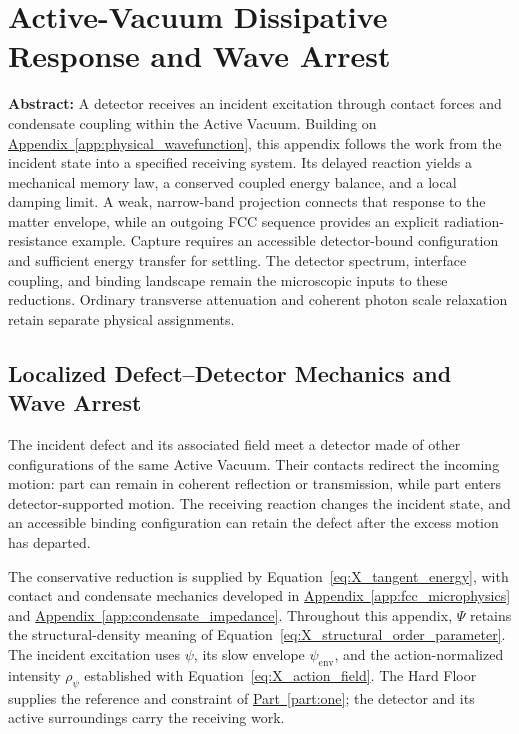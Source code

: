 \chapter{Active-Vacuum Dissipative Response and Wave Arrest}
\label{app:matter_vnlw_photon_linear_waveequation}

\noindent\textbf{Abstract:}
A detector receives an incident excitation through contact forces and condensate coupling within the Active Vacuum. Building on \hyperref[app:physical_wavefunction]{Appendix~\ref*{app:physical_wavefunction}}, this appendix follows the work from the incident state into a specified receiving system. Its delayed reaction yields a mechanical memory law, a conserved coupled energy balance, and a local damping limit. A weak, narrow-band projection connects that response to the matter envelope, while an outgoing FCC sequence provides an explicit radiation-resistance example. Capture requires an accessible detector-bound configuration and sufficient energy transfer for settling. The detector spectrum, interface coupling, and binding landscape remain the microscopic inputs to these reductions. Ordinary transverse attenuation and coherent photon scale relaxation retain separate physical assignments.

\section{Localized Defect--Detector Mechanics and Wave Arrest}
\label{sec:Y_defect_detector}

The incident defect and its associated field meet a detector made of other configurations of the same Active Vacuum. Their contacts redirect the incoming motion: part can remain in coherent reflection or transmission, while part enters detector-supported motion. The receiving reaction changes the incident state, and an accessible binding configuration can retain the defect after the excess motion has departed.

The conservative reduction is supplied by Equation~\eqref{eq:X_tangent_energy}, with contact and condensate mechanics developed in \hyperref[app:fcc_microphysics]{Appendix~\ref*{app:fcc_microphysics}} and \hyperref[app:condensate_impedance]{Appendix~\ref*{app:condensate_impedance}}. Throughout this appendix, $\Psi$ retains the structural-density meaning of Equation~\eqref{eq:X_structural_order_parameter}. The incident excitation uses $\psi$, its slow envelope $\psi_{\mathrm{env}}$, and the action-normalized intensity $\rho_\psi$ established with Equation~\eqref{eq:X_action_field}. The Hard Floor supplies the reference and constraint of \hyperref[part:one]{Part~\ref*{part:one}}; the detector and its active surroundings carry the receiving work.


